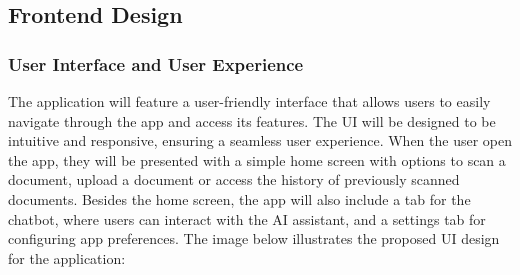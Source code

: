 \documentclass[12pt]{article}
\begin{document}
    \subsection{Frontend Design}

    \subsubsection{User Interface and User Experience}

        The application will feature a user-friendly interface that allows users to easily navigate through the app and access its features. The UI will be designed to be intuitive and responsive, ensuring a seamless user experience. When the user open the app, they will be presented with
        a simple home screen with options to scan a document, upload a document or access the history of previously scanned documents. Besides the home screen, the app will also include a tab for the chatbot, where users can interact with the AI assistant, and a settings tab for configuring
        app preferences. The image below illustrates the proposed UI design for the application:
\end{document}

